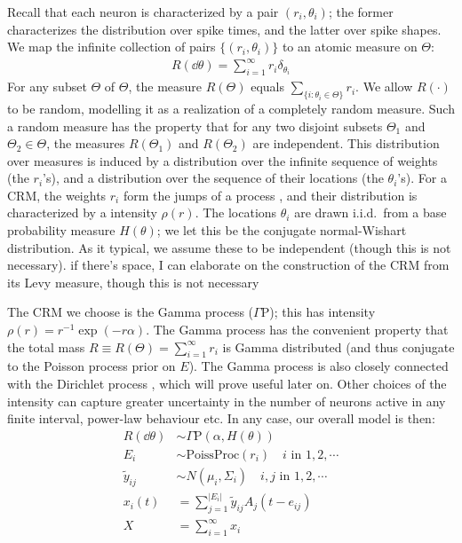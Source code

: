 Recall that each neuron is characterized by a pair $(r_i, \theta_i)$; the former characterizes the distribution over spike times, and the latter over spike
shapes. We map the infinite collection of pairs $\{(r_i, \theta_i)\}$ to an atomic measure on $\Theta$:
\begin{align}
  R(\dd \theta) = \sum_{i=1}^{\infty} r_i \delta_{\theta_i}
\end{align}
For any subset $\varTheta$ of $\Theta$, the measure $R(\varTheta)$ equals \( \sum_{\{ i: \theta_i \in \varTheta \} } r_i\). We allow $R(\cdot)$ to be random,
modelling it as a realization of a completely random measure. Such a random measure has the property that for any two disjoint subsets $\varTheta_1$ 
and $\varTheta_2 \in \Theta$, the measures $R(\varTheta_1)$ and $R(\varTheta_2)$ are independent. 
This distribution over measures is induced by a distribution
over the infinite sequence of weights (the $r_i$'s), and a distribution over the sequence of their locations (the $\theta_i$'s). 
For a CRM, the weights $r_i$ form the jumps of a \Levy process \citep{Sato90}, and their distribution is characterized by a 
\Levy intensity $\rho(r)$. The locations $\theta_i$ are drawn i.i.d.\  from a base probability measure $H(\theta)$; we let this be the conjugate
normal-Wishart distribution. As it typical, we assume these to be independent (though this is not necessary). {\color{red} if there's space, I
can elaborate on the construction of the CRM from its Levy measure, though this is not necessary}

The CRM we choose is the Gamma process ($\Gamma$P); this has \Levy intensity $\rho(r) = r^{-1}\exp(-r\alpha)$. The Gamma process has the convenient property that the 
total mass $R \equiv R(\Theta) = \sum_{i=1}^{\infty} r_i$ is Gamma distributed (and thus conjugate to the Poisson process prior on $E$). 
The Gamma process is also closely connected with the Dirichlet process \citep{Ferguson73}, which will prove useful
later on.
Other choices of the \Levy intensity can capture greater uncertainty in the number of neurons active in any finite interval, power-law behaviour etc.
In any case, our overall model is then:
\begin{align}
  R(\dd \theta) & \sim \Gamma \text{P}(\alpha, H(\theta)) \\ %
  E_i\ \  &\sim \text{PoissProc}(r_i) \quad i \text{ in } 1,2,\cdots \\
  \tilde{y}_{ij} & \sim N(\mu_i, \Sigma_i) \quad i,j \text{ in } 1,2,\cdots \\
  x_i(t) &= \sum_{j = 1}^{|E_i|} \tilde{y}_{ij} A_j(t - e_{ij}) \\
  X   &= \sum_{i=1}^{\infty} x_i
\end{align}

